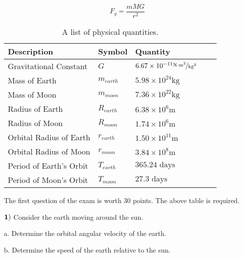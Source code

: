 \documentclass{article}
\begin{document}
   $$F_g=\frac{mMG}{r^2}$$
   \begin{table}[htbp]
\begin{center}
\footnotesize
\begin{tabular}{lllll}
\toprule
 Description              & Symbol          & Quantity                                                                \\
\midrule
  Gravitational Constant   & $G$             & $6.67 \times 10^{-11} \nicefrac{ \text{N}\cdot\text{m}^2}{\text{kg}^2}$ \\
    Mass of Earth   & $m_{earth}$           & $5.98\times 10^{24} \text{kg}$    \\
    Mass of Moon   & $m_{moon}$           & $7.36\times 10^{22} \text{kg}$    \\
    Radius of Earth     & $R_{earth}$           & $6.38 \times 10^{6} \text{m}$                   \\
     Radius of Moon    & $R_{moon}$           & $1.74 \times 10^{6} \text{m}$                   \\
     Orbital Radius of Earth    & $r_{earth}$           & $1.50 \times 10^{11} {\text{m}}$                   \\
     Orbital Radius of Moon    & $r_{moon}$           & $3.84 \times 10^{8} \text{m}$                   \\
      Period of Earth's Orbit     & $T_{earth}$ &   $365.24\text{ days}$                    \\
    Period of Moon's Orbit     & $T_{moon}$ &   $27.3\text{ days}$                    \\
                                     

\bottomrule
\end{tabular}
\end{center}
  \caption{A list of physical quantities.}
  \label{tab:font-sizes}
\end{table}

\newpage

The first question of the exam is worth 30 points.  The above table is required. 

 $\bf{1)}$ Consider the earth moving around the sun.
 
  \vspace{1cm}
 
 a.  Determine the orbital angular velocity of the earth.
 
 \vspace{3.5cm}
 
 b.  Determine the speed of the earth relative to the sun.
 
\end{document}
